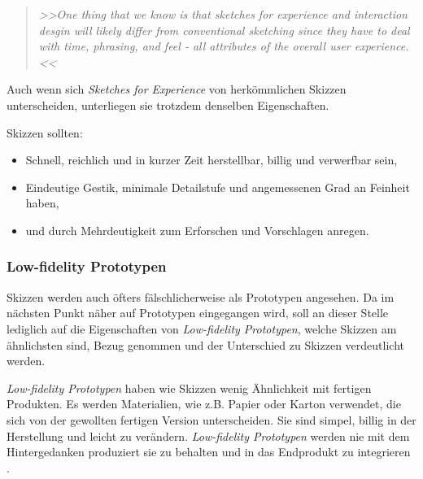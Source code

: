 \begin{quote}
	\textsl{>>One thing that we know is that sketches for experience and interaction desgin will likely differ from conventional sketching since they have to deal with time, phrasing, and feel - all attributes of the overall user experience.<<}
\begin{flushright}\citep{Buxton:2007}\end{flushright}
\end{quote}

Auch wenn sich \emph{Sketches for Experience} von herkömmlichen Skizzen unterscheiden, unterliegen sie trotzdem denselben Eigenschaften.

\medskip Skizzen sollten:
\begin{itemize}
	\item Schnell, reichlich und in kurzer Zeit herstellbar, billig und verwerfbar sein,
	\item Eindeutige Gestik, minimale Detailstufe und angemessenen Grad an Feinheit haben,
	\item und durch Mehrdeutigkeit zum Erforschen und Vorschlagen anregen.
\end{itemize}
\begin{flushright}\citep{Buxton:2007}\end{flushright}

\subsubsection{Low-fidelity Prototypen}  Skizzen werden auch öfters fälschlicherweise als Prototypen angesehen. Da im nächsten Punkt näher auf Prototypen eingegangen wird, soll an dieser Stelle lediglich auf die Eigenschaften von \emph{Low-fidelity Prototypen}, welche Skizzen am ähnlichsten sind, Bezug genommen und der Unterschied zu Skizzen verdeutlicht werden.

\medskip \emph{Low-fidelity Prototypen} haben wie Skizzen wenig Ähnlichkeit mit fertigen Produkten. Es werden Materialien, wie z.B. Papier oder Karton verwendet, die sich von der gewollten fertigen Version unterscheiden. Sie sind simpel, billig in der Herstellung und leicht zu verändern. \emph{Low-fidelity Prototypen} werden nie mit dem Hintergedanken produziert sie zu behalten und in das Endprodukt zu integrieren \citep{Sharp:2002}.

